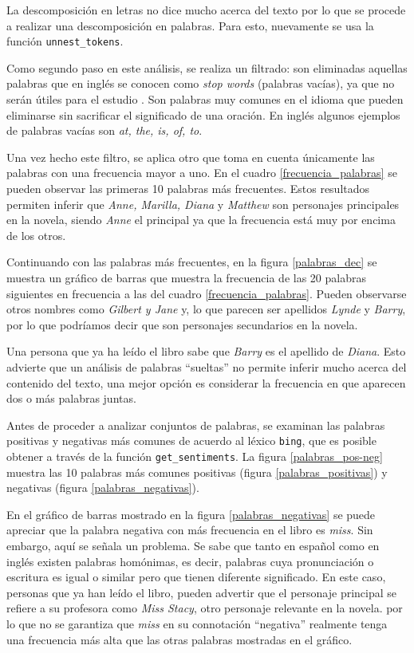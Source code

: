 \documentclass[12pt]{article}
\begin{document}
	La descomposición en letras no dice mucho acerca del texto por lo que se procede a realizar una descomposición en palabras. Para esto, nuevamente se usa la función \texttt{unnest\_tokens}.
	
	Como segundo paso en este análisis, se realiza un filtrado: son eliminadas aquellas palabras que en inglés se conocen como \textit{stop words} (palabras vacías), ya que no serán útiles para el estudio \cite{textMining}. Son palabras muy comunes en el idioma que pueden eliminarse sin sacrificar el significado de una oración. En inglés algunos ejemplos de palabras vacías son \textit{at, the, is, of, to}.
	
	Una vez hecho este filtro, se aplica otro que toma en cuenta únicamente las palabras con una frecuencia mayor a uno. En el cuadro \ref{frecuencia_palabras} se pueden observar las primeras 10 palabras más frecuentes. Estos resultados permiten inferir que \textit{Anne, Marilla, Diana} y \textit{Matthew} son personajes principales en la novela, siendo \textit{Anne} el principal ya que la frecuencia está muy por encima de los otros.
	
	Continuando con las palabras más frecuentes, en la figura \ref{palabras_dec} se muestra un gráfico de barras que muestra la frecuencia de las 20 palabras siguientes en frecuencia a las del cuadro \ref{frecuencia_palabras}. Pueden observarse otros nombres como \textit{Gilbert y Jane} y, lo que parecen ser apellidos \textit{Lynde} y \textit{Barry}, por lo que podríamos decir que son personajes secundarios en la novela. 
	
	Una persona que ya ha leído el libro sabe que \textit{Barry} es el apellido de \textit{Diana}. Esto advierte que un análisis de palabras ``sueltas'' no permite inferir mucho acerca del contenido del texto, una mejor opción es considerar la frecuencia en que aparecen dos o más palabras juntas.
	
	Antes de proceder a analizar conjuntos de palabras, se examinan las palabras positivas y negativas más comunes de acuerdo al léxico \texttt{bing}, que es posible obtener a través de la función \texttt{get\_sentiments}. La figura \ref{palabras_pos-neg} muestra las 10 palabras más comunes positivas (figura \ref{palabras_positivas}) y negativas (figura \ref{palabras_negativas}). 
	
	En el gráfico de barras mostrado en la figura \ref{palabras_negativas} se puede apreciar que la palabra negativa con más frecuencia en el libro es \textit{miss}. Sin embargo, aquí se señala un problema. Se sabe que tanto en español como en inglés existen palabras homónimas, es decir, palabras cuya pronunciación o escritura es igual o similar pero que tienen diferente significado. En este caso, personas que ya han leído el libro, pueden advertir que el personaje principal se refiere a su profesora como \textit{Miss Stacy}, otro personaje relevante en la novela. por lo que no se garantiza que \textit{miss} en su connotación ``negativa'' realmente tenga una frecuencia más alta que las otras palabras mostradas en el gráfico.
	
\end{document}
